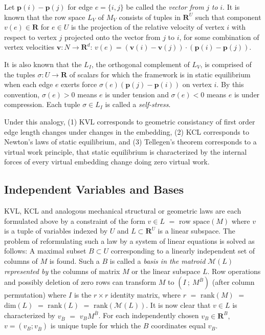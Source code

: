\documentclass{article}
\def\Reals{\ensuremath{\mathbf R}}
\begin{document}
Let $\mathbf{p}(i)-\mathbf{p}(j)$ for edge $e=\{i,j\}$ be called the
\textit{vector from } $j$ \textit{to} $i$.  
It is known that the row space $L_V$ 
of $M_V$ consists of tuples in $\Reals^{U}$
such that component $v(e)\in\Reals$ for $e\in U$ is the projection of the
relative velocity of vertex $i$ with respect to vertex $j$ projected onto
the vector from $j$ to $i$, for some combination of vertex velocities 
$\mathbf{v}:N\rightarrow\Reals^d$:
$v(e)=(\mathbf{v}(i)-\mathbf{v}(j))\cdot(\mathbf{p}(i)-\mathbf{p}(j))$.

It is also known that the $L_I$, the orthogonal complement of $L_V$, 
is comprised of the tuples $\sigma:U\rightarrow\Reals$ 
of scalars for which the framework is in static
equilibrium when each edge $e$ exerts force 
$\sigma(e)(\mathbf{p}(j)-\mathbf{p}(i))$ on vertex $i$.  By this convention, 
$\sigma(e)>0$ means $e$ is under tension and $\sigma(e)<0$ means $e$ is under 
compression.  Each tuple $\sigma\in L_I$ is called a \textit{self-stress}.

Under this analogy, 
(1) KVL corresponds to geometric consistancy of first order
edge length changes under changes in the embedding, (2) KCL corresponds to
Newton's laws of static equilibrium, and (3) Tellegen's theorem corresponds
to a virtual work principle, that static equilibrium is
characterized by 
the internal forces of every virtual embedding change 
doing zero virtual work.

\subsection{Independent Variables and Bases}
KVL, KCL and analogous mechanical structural or geometric laws 
are each formulated above by a constraint of the form 
$v\in L$ $=$ $\mbox{row space}(M)$
where $v$ is a tuple of variables indexed by $U$
and $L\subset\Reals^U$ is a linear subspace.  The problem of
reformulating such a law by a system of linear equations is
solved as follows:  A maximal subset $B\subset U$ corresponding to
a linearly independent set of columns of $M$ is found.  Such a $B$ is
called a \textit{basis in the matroid} $\mathcal{M}(L)$ 
\textit{represented by} the columns of matrix $M$ or the linear subspace
$L$.  Row operations and possibly deletion of zero rows can transform
$M$ to $( I\ ;\ M^{\overline{B}} )$ (after column permutation)
where $I$ is the $r\times r$ identity matrix, where $r$ $=$ 
$\mbox{rank}(M)$ $=$ $\mbox{dim}(L)$ $=$ $\mbox{rank}(L)$
$=$ $\mbox{rank}(\mathcal{M}(L))$.    
It is now clear that $v\in L$ is characterized by 
$v_{\overline{B}}$ $=$ $v_{B}M^{\overline{B}}$.
For each independently chosen
$v_{B}\in\Reals^B,$ $v=(v_B;v_{\overline{B}})$ is unique tuple
for which the $B$ coordinates equal $v_B$.
\end{document}
